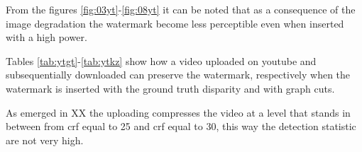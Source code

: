 From the figures \ref{fig:03yt}-\ref{fig:08yt} it can be noted that as a consequence of the image degradation the watermark become less perceptible even when inserted with a high power. 

Tables \ref{tab:ytgt}-\ref{tab:ytkz} show how a video uploaded on youtube and subsequentially downloaded can preserve the watermark, respectively when the watermark is inserted with the ground truth disparity and with graph cuts.\newline
 
 
 \begin{table}[htbp]

  \begin{center}
  \caption{Detection statistic for a downloaded video marked with ground truth disparity\label{tab:ytgt}}
  \end{center}
  \end{table}
 
\begin{table}[htbp]
 
 \begin{center}
 \caption{Detection statistic for a downloaded video marked with graph cuts disparity\label{tab:ytkz}}
 \end{center}
 \end{table}
 \clearpage
 
As emerged in XX the uploading compresses the video at a level that stands in between from crf equal to 25 and crf equal to 30, this way the detection statistic are not very high.  
 
